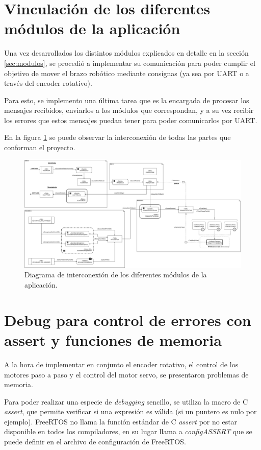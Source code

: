 \documentclass{IEEEtran}
\begin{document}
\section{Vinculación de los diferentes módulos de la aplicación}
\label{sec:vinculacion}

Una vez desarrollados los distintos módulos explicados en detalle en la sección \ref{sec:modulos}, se procedió a implementar su comunicación para poder cumplir el objetivo de mover el brazo robótico mediante consignas (ya sea por UART o a través del encoder rotativo).

Para esto, se implemento una última tarea que es la encargada de procesar los mensajes recibidos, enviarlos a los módulos que correspondan, y a su vez recibir los errores que estos mensajes puedan tener para poder comunicarlos por UART.

En la figura \ref{fig:diagrama-app} se puede observar la interconexión de todas las partes que conforman el proyecto.

\begin{figure}
    \centering
    \includegraphics[scale=0.35]{../diagrama_app.png}
    \caption{Diagrama de interconexión de los diferentes módulos de la aplicación.}
    \label{fig:diagrama-app}
\end{figure}

\section{Debug para control de errores con assert y funciones de memoria}
\label{sec:debug}

A la hora de implementar en conjunto el encoder rotativo, el control de los motores paso a paso y el control del motor servo, se presentaron problemas de memoria.

Para poder realizar una especie de \textit{debugging} sencillo, se utiliza la macro de C \textit{assert}, que permite verificar si una expresión es válida (si un puntero es nulo por ejemplo). FreeRTOS no llama la función estándar de C \textit{assert} por no estar disponible en todos los compiladores, en su lugar llama a \textit{configASSERT} que se puede definir en el archivo de configuración de FreeRTOS.
\end{document}
